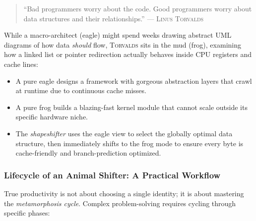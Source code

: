 \documentclass{article}
\begin{document}
\begin{quote}
	``Bad programmers worry about the code. Good programmers worry about data structures and their relationships.'' --- \textsc{Linus Torvalds}
\end{quote}

While a macro-architect (eagle) might spend weeks drawing abstract UML diagrams of how data \textit{should} flow, \textsc{Torvalds} sits in the mud (frog), examining how a linked list or pointer redirection actually behaves inside CPU registers and cache lines:
\begin{itemize}
	\item A pure eagle designs a framework with gorgeous abstraction layers that crawl at runtime due to continuous cache misses.
	\item A pure frog builds a blazing-fast kernel module that cannot scale outside its specific hardware niche.
	\item The \textit{shapeshifter} uses the eagle view to select the globally optimal data structure, then immediately shifts to the frog mode to ensure every byte is cache-friendly and branch-prediction optimized.
\end{itemize}

\subsubsection{Lifecycle of an Animal Shifter: A Practical Workflow}

True productivity is not about choosing a single identity; it is about mastering the \textit{metamorphosis cycle}. Complex problem-solving requires cycling through specific phases:
\end{document}
